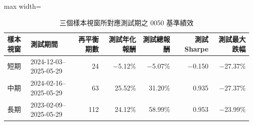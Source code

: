 \begin{table}[H]
\centering
\caption{三個樣本視窗所對應測試期之 0050 基準績效}
\label{tab:results_benchmark_0050}
\begingroup
\scriptsize
\setlength{\tabcolsep}{4pt}
\renewcommand{\arraystretch}{1.10}
\begin{adjustbox}{max width=\textwidth}
\begin{tabular}{@{}llrrrrr@{}}
\toprule
樣本視窗 & 測試期間 & 再平衡期數 & 測試年化報酬 & 測試總報酬 & 測試 Sharpe & 測試最大跌幅 \\
\midrule
短期 & 2024-12-03--2025-05-29 & 24 & $-$5.12\% & $-$5.07\% & $-$0.150 & $-$27.37\% \\
中期 & 2024-02-16--2025-05-29 & 63 & 25.52\% & 31.20\% & 0.935 & $-$27.37\% \\
長期 & 2023-02-09--2025-05-29 & 112 & 24.12\% & 58.99\% & 0.953 & $-$23.99\% \\
\bottomrule
\end{tabular}
\end{adjustbox}
\endgroup
\end{table}
